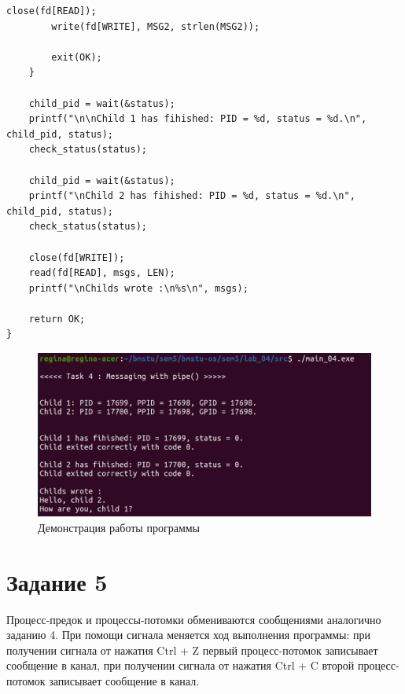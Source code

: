 \begin{center}
\begin{lstlisting}[label=lst:pipe,caption=Системный вызов pipe()]
        close(fd[READ]);
        write(fd[WRITE], MSG2, strlen(MSG2));

        exit(OK);
    }

    child_pid = wait(&status);
    printf("\n\nChild 1 has fihished: PID = %d, status = %d.\n", child_pid, status);
    check_status(status);

    child_pid = wait(&status);
    printf("\nChild 2 has fihished: PID = %d, status = %d.\n", child_pid, status);
    check_status(status);

    close(fd[WRITE]);
    read(fd[READ], msgs, LEN);
    printf("\nChilds wrote :\n%s\n", msgs);

    return OK;
}
\end{lstlisting}
\end{center}

\begin{figure}[H]
	\begin{center}
		\includegraphics[scale=0.3]{inc/pipe.png}
	\end{center}
	\captionsetup{justification=centering}
	\caption{Демонстрация работы программы}
	\label{img:pipe}
\end{figure}

\section*{Задание 5}

Процесс-предок и процессы-потомки обмениваются сообщениями аналогично заданию 4. При помощи сигнала меняется ход выполнения программы: при получении сигнала от нажатия Ctrl + Z первый процесс-потомок записывает сообщение в канал, при получении сигнала от нажатия Ctrl + C второй процесс-потомок записывает сообщение в канал.


